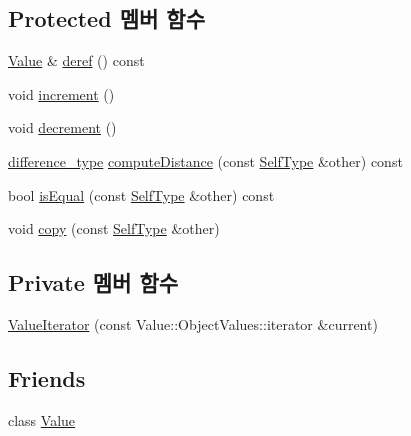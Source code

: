 \subsection*{Protected 멤버 함수}
\begin{DoxyCompactItemize}
\item 
\hyperlink{class_json_1_1_value}{Value} \& \hyperlink{class_json_1_1_value_iterator_base_aa5b75c9514a30ba2ea3c9a35c165c18e}{deref} () const
\item 
void \hyperlink{class_json_1_1_value_iterator_base_afe58f9534e1fd2033419fd9fe244551e}{increment} ()
\item 
void \hyperlink{class_json_1_1_value_iterator_base_affc8cf5ff54a9f432cc693362c153fa6}{decrement} ()
\item 
\hyperlink{class_json_1_1_value_iterator_base_a4e44bf8cbd17ec8d6e2c185904a15ebd}{difference\+\_\+type} \hyperlink{class_json_1_1_value_iterator_base_af11473c9e20d07782e42b52a2f9e4540}{compute\+Distance} (const \hyperlink{class_json_1_1_value_iterator_base_a9d2a940d03ea06d20d972f41a89149ee}{Self\+Type} \&other) const
\item 
bool \hyperlink{class_json_1_1_value_iterator_base_a010b5ad3f3337ae3732e5d7e16ca5e25}{is\+Equal} (const \hyperlink{class_json_1_1_value_iterator_base_a9d2a940d03ea06d20d972f41a89149ee}{Self\+Type} \&other) const
\item 
void \hyperlink{class_json_1_1_value_iterator_base_a496e6aba44808433ec5858c178be5719}{copy} (const \hyperlink{class_json_1_1_value_iterator_base_a9d2a940d03ea06d20d972f41a89149ee}{Self\+Type} \&other)
\end{DoxyCompactItemize}
\subsection*{Private 멤버 함수}
\begin{DoxyCompactItemize}
\item 
\hyperlink{class_json_1_1_value_iterator_afb06ea21add440c78c27dc49570460a5}{Value\+Iterator} (const Value\+::\+Object\+Values\+::iterator \&current)
\end{DoxyCompactItemize}
\subsection*{Friends}
\begin{DoxyCompactItemize}
\item 
class \hyperlink{class_json_1_1_value_iterator_aeceedf6e1a7d48a588516ce2b1983d6f}{Value}
\end{DoxyCompactItemize}


